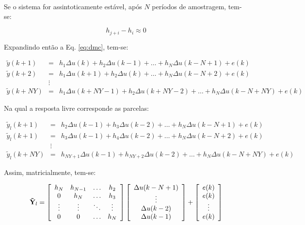 Se o sistema for assintoticamente estável, após $N$ períodos de amostragem,
tem-se:

\begin{equation*}
h_{j+i} - h_i \approx 0
\end{equation*}

Expandindo então a Eq. \ref{eq:dmc}, tem-se:

\begin{eqnarray}
\tilde{y}(k+1)  & = & h_1\Delta u(k) + h_2\Delta u(k-1) + \ldots + h_N\Delta
                      u(k-N+1) + e(k)\nonumber\\
\tilde{y}(k+2)  & = & h_1\Delta u(k+1) + h_2\Delta u(k) + \ldots + h_N\Delta
                      u(k-N+2) + e(k)\nonumber\\
& \vdots & \nonumber\\
\tilde{y}(k+NY) & = & h_1\Delta u(k+NY-1) + h_2\Delta u(k+NY-2) + \ldots + 
                      h_N\Delta u(k-N+NY) + e(k)\nonumber
\end{eqnarray}

Na qual a resposta livre corresponde as parcelas:

\begin{eqnarray}
\tilde{y}_l(k+1)  & = & h_2\Delta u(k-1) + h_3\Delta u(k-2) + \ldots +
                        h_N\Delta u(k-N+1) + e(k)\nonumber\\
\tilde{y}_l(k+1)  & = & h_3\Delta u(k-1) + h_4\Delta u(k-2) + \ldots +
                        h_N\Delta u(k-N+2) + e(k)\nonumber\\
& \vdots & \nonumber\\
\tilde{y}_l(k+NY) & = & h_{NY+1}\Delta u(k-1) + h_{NY+2}\Delta u(k-2) + 
                        \ldots + h_N\Delta u(k-N+NY) + e(k)\nonumber
\end{eqnarray}

Assim, matricialmente, tem-se:

\begin{equation}\label{eq:resp_livre_mat}
\mathbf{\tilde{Y}}_l = 
\left[
    \begin{array}{cccc}
        h_N & h_{N-1} & \ldots & h_2\\
        0 & h_N & \ldots & h_3\\
        \vdots & \vdots & \ddots & \vdots\\
        0 & 0 & \ldots & h_N
    \end{array}
\right]
\left[
    \begin{array}{c}
        \Delta u(k-N+1)\\
        \vdots\\
        \Delta u(k-2)\\
        \Delta u(k-1)
    \end{array}
\right]
+
\left[
    \begin{array}{c}
        e(k)\\
        e(k)\\
        \vdots\\
        e(k)
    \end{array}
\right]
\end{equation}

